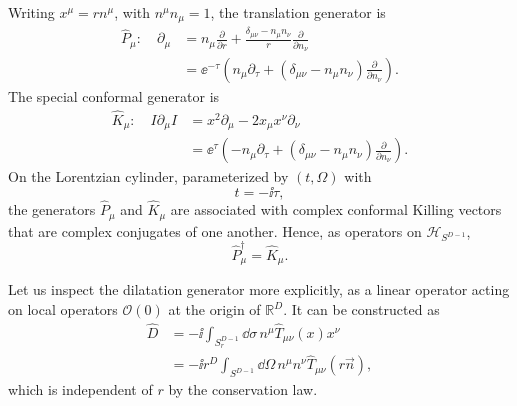 Writing \(x^\mu=r n^\mu\), with \(n^\mu n_\mu=1\), the translation
generator is
\[
\begin{aligned}
  \widehat P_\mu:\quad
  \partial_\mu
  &=
  n_\mu\frac{\partial}{\partial r}
  +
  \frac{\delta_{\mu\nu}-n_\mu n_\nu}{r}
  \frac{\partial}{\partial n_\nu}
\\
  &=
  \ee^{-\tau}
  \left(
    n_\mu\partial_\tau
    +
    (\delta_{\mu\nu}-n_\mu n_\nu)
    \frac{\partial}{\partial n_\nu}
  \right).
\end{aligned}
\]
The special conformal generator is
\[
\begin{aligned}
  \widehat K_\mu:\quad
  I\partial_\mu I
  &=
  x^2\partial_\mu-2x_\mu x^\nu\partial_\nu
\\
  &=
  \ee^\tau
  \left(
    -n_\mu\partial_\tau
    +
    (\delta_{\mu\nu}-n_\mu n_\nu)
    \frac{\partial}{\partial n_\nu}
  \right).
\end{aligned}
\]
On the Lorentzian cylinder, parameterized by \((t,\Omega)\) with
\[
  t=-\ii\tau,
\]
the generators \(\widehat P_\mu\) and \(\widehat K_\mu\) are associated
with complex conformal Killing vectors that are complex conjugates of
one another.  Hence, as operators on \(\mathcal H_{S^{D-1}}\),
\[
  \widehat P_\mu^\dagger=\widehat K_\mu .
\]

Let us inspect the dilatation generator more explicitly, as a linear
operator acting on local operators \(\mathcal O(0)\) at the origin of
\(\mathbb R^D\).  It can be constructed as
\[
\begin{aligned}
  \widehat D
  &=
  -\ii
  \int_{S_r^{D-1}}\dd\sigma\,
  n^\mu \widehat T_{\mu\nu}(x)x^\nu
\\
  &=
  -\ii r^D
  \int_{S^{D-1}}\dd\Omega\,
  n^\mu n^\nu\widehat T_{\mu\nu}(r\vec n),
\end{aligned}
\]
which is independent of \(r\) by the conservation law.

\begin{center}
\end{center}

